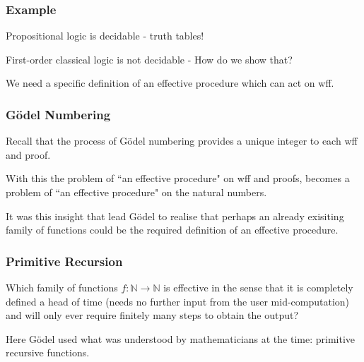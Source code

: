 \documentclass{beamer}
\begin{document}
\begin{frame}
	\frametitle{Example}
	
	Propositional logic is decidable - truth tables!
	
	\vspace{0.5cm}
	
	First-order classical logic is not decidable - How do we show that?
	
	\vspace{1cm} 
	
	We need a specific definition of an effective procedure which can act on wff. 
	
\end{frame}

\begin{frame}
	\frametitle{G\"{o}del Numbering}
	
	Recall that the process of G\"{o}del numbering provides a unique integer to each wff and proof.
	
	\vspace{0.5cm}
	
	With this the problem of ``an effective procedure" on wff and proofs, becomes a problem of ``an effective procedure" on the natural numbers. 
	
	\vspace{3cm}
	
	It was this insight that lead G\"{o}del to realise that perhaps an already exisiting family of functions could be the required definition of an effective procedure.
	
	\vspace{0.5cm}
	
\end{frame}


\begin{frame}
	\frametitle{Primitive Recursion}
	
	Which family of functions $f:\mathbb{N} \rightarrow \mathbb{N}$ is effective in the sense that it is completely defined a head of time (needs no further input from the user mid-computation) and will only ever require finitely many steps to obtain the output? 
	
	\vspace{0.5cm} 
	
	Here G\"{o}del used what was understood by mathematicians at the time: primitive recursive functions.
\end{frame}
\end{document}
